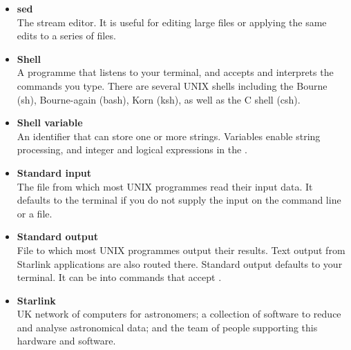 \begin{itemize}

\item {\bf\label{sc4_gl_sed}sed}\\
      The stream editor.  It is useful for editing large files or
      applying the same edits to a series of files.

\item {\bf\label{sc4_gl_she}Shell}\\
      A programme that listens to your terminal, and accepts and
      interprets the commands you type.  There are several UNIX
      shells including the Bourne (sh), Bourne-again (bash),
      Korn (ksh), as well as the C shell (csh).

\item {\bf\label{sc4_gl_she_var}Shell variable}\\
      An identifier that can store one or more strings.  Variables
      enable string processing, and integer and logical expressions
      in the .

\item {\bf\label{sc4_gl_std_inp}Standard input}\\
      The file from which most UNIX programmes read their input data.
      It defaults to the terminal if you do not supply the input on
      the command line or a file.

\item {\bf\label{sc4_gl_std_out}Standard output}\\
      File to which most UNIX programmes output their results.  Text
      output from Starlink applications are also routed there.
      Standard output defaults to your terminal.  It can be
       into commands that accept
      .

\item {\bf\label{sc4_gl_starlink}Starlink}\\
      UK network of computers for astronomers; a collection of
      software to reduce and analyse astronomical data; and the team
      of people supporting this hardware and software.


\end{itemize}
